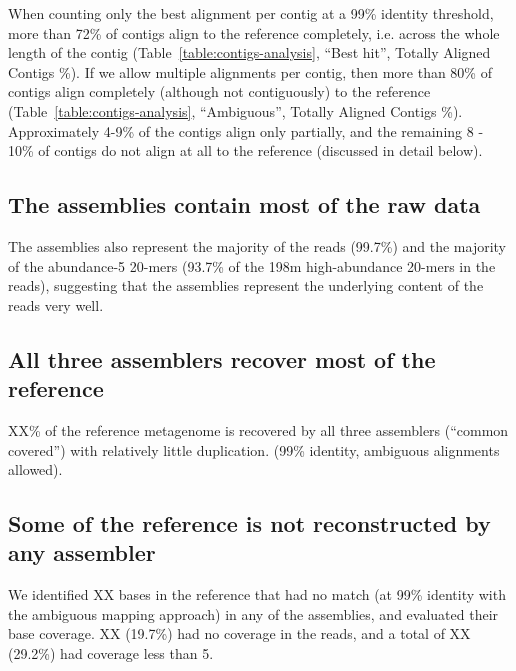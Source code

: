 \documentclass[10pt,a4paper,twocolumn]{article}
\begin{document}
When counting only the best alignment per contig at a 99\%
identity threshold, more than 72\% of contigs align to the reference
completely, i.e. across the whole length of the contig (Table~\ref{table:contigs-analysis}, ``Best hit'', Totally Aligned Contigs \%).  If we allow
multiple alignments per contig, then more than 80\% of contigs align
completely (although not contiguously) to the reference (Table~\ref{table:contigs-analysis}, ``Ambiguous'', Totally Aligned Contigs \%).
Approximately 4-9\% of the contigs align only partially, and the
remaining 8 - 10\% of contigs do not align at all to the reference
(discussed in detail below).

\subsection*{The assemblies contain most of the raw data}

The assemblies also represent the majority of the reads (99.7\%) and
the majority of the abundance-5 20-mers (93.7\% of the 198m
high-abundance 20-mers in the reads), suggesting that the assemblies
represent the underlying content of the reads very well.

\subsection*{All three assemblers recover most of the reference}


XX\% of the reference metagenome is recovered by all three assemblers
(“common covered”) with relatively little duplication. (99\% identity,
ambiguous alignments allowed).
 
\subsection*{Some of the reference is not reconstructed by any assembler}
 
We identified XX bases in the reference that had no match (at 99\%
identity with the ambiguous mapping approach) in any of the
assemblies, and evaluated their base coverage. XX (19.7\%) had no coverage
in the reads, and a total of XX (29.2\%) had coverage less than 5.
\end{document}
